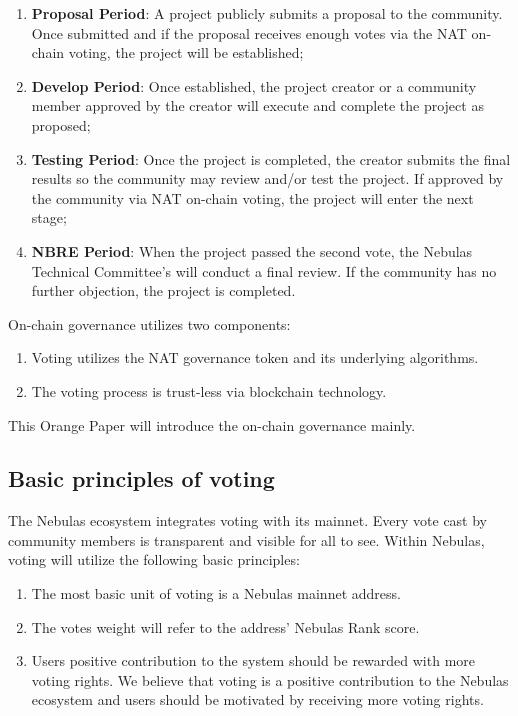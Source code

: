 \begin{enumerate}
	\item \textbf{Proposal Period}: A project publicly submits a proposal to the community. Once submitted and if the proposal receives enough votes via the NAT on-chain voting, the project will be established;
	\item \textbf{Develop Period}: Once established, the project creator or a community member approved by the creator will execute and complete the project as proposed;
	\item \textbf{Testing Period}: Once the project is completed, the creator submits the final results so the community may review and/or test the project. If approved by the community via NAT on-chain voting, the project will enter the next stage;
	\item \textbf{NBRE Period}: When the project passed the second vote, the Nebulas Technical Committee's will conduct a final review. If the community has no further objection, the project is completed.
\end{enumerate}

On-chain governance utilizes two components:

\begin{enumerate}
	\item Voting utilizes the NAT governance token and its underlying algorithms.
	\item The voting process is trust-less via blockchain technology.
\end{enumerate}

This Orange Paper will introduce the on-chain governance mainly.

\subsection{Basic principles of voting}

The Nebulas ecosystem integrates voting with its mainnet. Every vote cast by community members is transparent and visible for all to see. Within Nebulas, voting will utilize the following basic principles:

\begin{enumerate}
	\item The most basic unit of voting is a Nebulas mainnet address.
	\item The votes weight will refer to the address' Nebulas Rank score.
	\item Users positive contribution to the system should be rewarded with more voting rights. We believe that voting is a positive contribution to the Nebulas ecosystem and users should be motivated by receiving more voting rights.
\end{enumerate}

